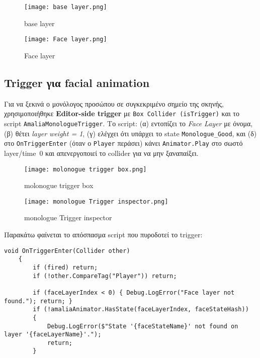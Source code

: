 \begin{figure}[H]
    \centering
    \texttt{[image: base layer.png]}
    \caption{base layer}
    \label{fig:placeholder}
\end{figure}
\begin{figure}[H]
    \centering
    \texttt{[image: Face layer.png]}
    \caption{Face layer}
    \label{fig:placeholder}
\end{figure}

\subsection*{Trigger για facial animation}
Για να ξεκινά ο μονόλογος προσώπου σε συγκεκριμένο σημείο της σκηνής, χρησιμοποιήθηκε \textbf{Editor-side trigger} με \texttt{Box Collider (isTrigger)} και το script \texttt{AmaliaMonologueTrigger}. Το script:
(α) εντοπίζει το \textit{Face Layer} με όνομα, (β) θέτει \emph{layer weight = 1}, (γ) ελέγχει ότι υπάρχει το state \texttt{Monologue\_Good}, και (δ) στο \texttt{OnTriggerEnter} (όταν ο \texttt{Player} περάσει) κάνει \texttt{Animator.Play} στο σωστό layer/time~0 και απενεργοποιεί το collider για να μην ξαναπαίξει.

\begin{figure}[H]
    \centering
    \texttt{[image: molonogue trigger box.png]}
    \caption{molonogue trigger box}
    \label{fig:placeholder}
\end{figure}
\begin{figure} [H]
    \centering
    \texttt{[image: monologue Trigger inspector.png]}
    \caption{monologue Trigger inspector}
    \label{fig:placeholder}
\end{figure}

Παρακάτω φαίνεται το απόσπασμα script που πυροδοτεί το trigger:
\begin{lstlisting}[style=code, caption={Trigger ενός facial state}, label={lst:monologue-trigger}]
void OnTriggerEnter(Collider other)
    {
        if (fired) return;
        if (!other.CompareTag("Player")) return;

        if (faceLayerIndex < 0) { Debug.LogError("Face layer not found."); return; }
        if (!amaliaAnimator.HasState(faceLayerIndex, faceStateHash))
        {
            Debug.LogError($"State '{faceStateName}' not found on layer '{faceLayerName}'.");
            return;
        }

\end{lstlisting}

